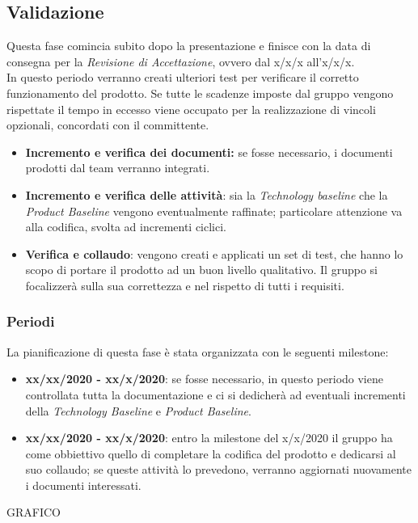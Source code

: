 \subsection{Validazione}
Questa fase comincia subito dopo la presentazione e finisce con la data di consegna per la \textit{Revisione di Accettazione}, ovvero dal x/x/x all'x/x/x.\\
In questo periodo verranno creati ulteriori test per verificare il corretto funzionamento del prodotto. Se tutte le scadenze imposte dal gruppo vengono rispettate il tempo in eccesso viene occupato per la realizzazione di vincoli opzionali, concordati con il committente. 

\begin{itemize}
\item \textbf{Incremento e verifica dei documenti:} se fosse necessario, i documenti prodotti dal team verranno integrati.

 \item \textbf{Incremento e verifica delle attività}: sia la \textit{Technology baseline} che la \textit{Product Baseline} vengono eventualmente raffinate; particolare attenzione va alla codifica, svolta ad incrementi ciclici.

 \item \textbf{Verifica e collaudo}: vengono creati e applicati un set di test, che hanno lo scopo di portare il prodotto ad un buon livello qualitativo. Il gruppo si focalizzerà sulla sua correttezza e nel rispetto di tutti i requisiti.
\end{itemize}

\subsubsection{Periodi}
La pianificazione di questa fase è stata organizzata con le seguenti milestone:

\begin{itemize}
\item \textbf{xx/xx/2020 - xx/x/2020}: se fosse necessario, in questo periodo viene controllata tutta la documentazione e ci si dedicherà ad eventuali incrementi della \textit{Technology Baseline} e \textit{Product Baseline}.

\item \textbf{xx/xx/2020 - xx/x/2020}: entro la milestone del x/x/2020 il gruppo ha come obbiettivo quello di completare la codifica del prodotto e dedicarsi al suo collaudo; se queste attività lo prevedono, verranno aggiornati nuovamente i documenti interessati.

\end{itemize}


GRAFICO